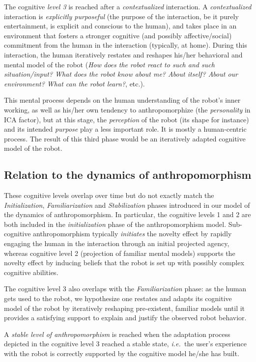 \documentclass{frontiersSCNS} %
\newcommand{\ie}{{\textit{i.e.~}}}
\begin{document}
The cognitive \emph{level 3} is reached after a \emph{contextualized} interaction.
A \emph{contextualized} interaction is \emph{explicitly purposeful} (the purpose
of the interaction, be it purely entertainment, is explicit and conscious to the
human), and takes place in an environment that fosters a stronger cognitive (and
possibly affective/social) commitment from the human in the interaction
(typically, at home). During this interaction, the human iteratively restates
and reshapes his/her behavioral and mental model of the robot (\emph{How does
the robot react to such and such situation/input?  What does the robot know
about me? About itself? About our environment? What can the robot learn?}, etc.).

This mental process depends on the human understanding of the robot's
inner working, as well as his/her own tendency to anthropomorphize (the
\emph{personality} in ICA factor), but at this
stage, the \emph{perception} of the robot (its shape for instance) and its
intended \emph{purpose} play a less important role. It is mostly a human-centric
process.  The result of this third phase would be an iteratively adapted
cognitive model of the robot.


\subsection{Relation to the dynamics of anthropomorphism}

These cognitive levels overlap over time but do not exactly match the
\emph{Initialization}, \emph{Familiarization} and \emph{Stabilization} phases
introduced in our model of the dynamics of anthropomorphism. In particular,
the cognitive levels 1 and 2 are both included in the \emph{initialization} phase
of the anthropomorphism model. Sub-cognitive anthropomorphism typically
\emph{initiates} the novelty effect by rapidly engaging the human in the
interaction through an initial projected agency, whereas cognitive level 2
(projection of familiar mental models) supports the novelty effect by inducing
beliefs that the robot is set up with possibly complex cognitive abilities.

The cognitive level 3 also overlaps with the \emph{Familiarization} phase: as
the human gets used to the robot, we hypothesize one restates and adapts its
cognitive model of the robot by iteratively reshaping pre-existent, familiar
models until it provides a satisfying support to explain and justify the
observed robot behavior.

A \emph{stable level of anthropomorphism} is reached when the adaptation process
depicted in the cognitive level 3 reached a stable state, \ie the user's
experience with the robot is correctly supported by the cognitive model he/she
has built.
\end{document}
